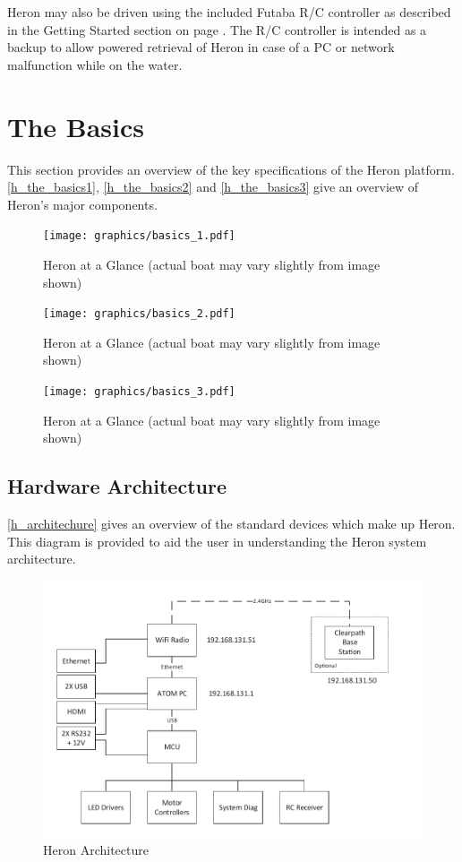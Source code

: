 \documentclass[]{clearpath-latex/clearpath-manual}
\begin{document}
Heron may also be driven using the included Futaba R/C controller as described in the Getting Started section on page \pageref{gettingstarted}. The R/C controller is intended as a backup to allow powered retrieval of Heron in case of a PC or network malfunction while on the water.

\section{The Basics}
This section provides an overview of the key specifications of the Heron platform. \autoref{h_the_basics1}, \autoref{h_the_basics2} and \autoref{h_the_basics3} give an overview of Heron's major components.

\begin{figure}[h]
  \centering  \texttt{[image: graphics/basics\_1.pdf]}
  \caption{Heron at a Glance (actual boat may vary slightly from image shown)}
  \label{h_the_basics1}
\end{figure}

\begin{figure}[h]
  \centering  \texttt{[image: graphics/basics\_2.pdf]}
  \caption{Heron at a Glance (actual boat may vary slightly from image shown)}
  \label{h_the_basics2}
\end{figure}

\begin{figure}[h]
  \centering  \texttt{[image: graphics/basics\_3.pdf]}
  \caption{Heron at a Glance (actual boat may vary slightly from image shown)}
  \label{h_the_basics3}
\end{figure}

\newpage

\subsection{Hardware Architecture}
\autoref{h_architechure} gives an overview of the standard devices which make up Heron. This diagram is provided to aid the user in understanding the Heron system architecture.

\begin{figure}[h]
  \centering
  \includegraphics[width=0.85\linewidth]{graphics/h-architecture.pdf}
  \caption{Heron Architecture}
  \label{h_architechure}
\end{figure}
\end{document}
